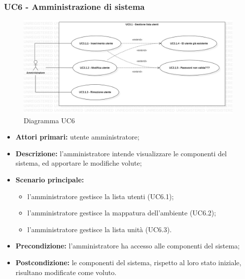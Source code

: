 \subsubsection{UC6 - Amministrazione di sistema}
	\begin{center}
		\begin{figure}[h!]
			\includegraphics[width=15cm]{images/uc3.1.jpg}
			\caption{Diagramma UC6}
		\end{figure}
	\end{center}
	\begin{itemize}
		\item \textbf{Attori primari:} utente amministratore;
		\item \textbf{Descrizione:} l'amministratore intende visualizzare le componenti del sistema, ed apportare le modifiche volute;
		\item \textbf{Scenario principale:} 
			\begin{itemize}
				\item l'amministratore gestisce la lista utenti (UC6.1);
				\item l'amministratore gestisce la mappatura dell'ambiente (UC6.2);
				\item l'amministratore gestisce la lista unità (UC6.3).
			\end{itemize}
		\item \textbf{Precondizione:} l'amministratore ha accesso alle componenti del sistema;
		\item \textbf{Postcondizione:} le componenti del sistema, rispetto al loro stato iniziale, risultano modificate come voluto.
	\end{itemize}
	
